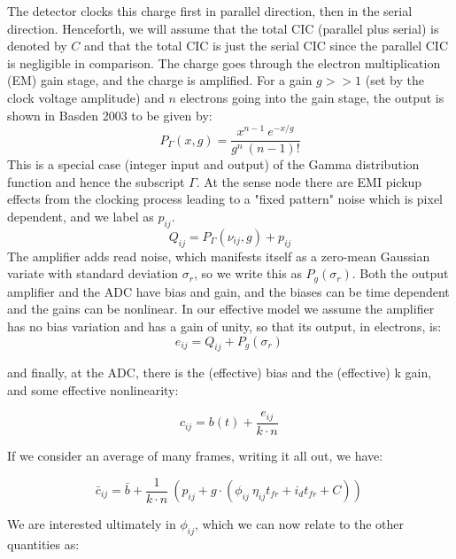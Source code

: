 \documentclass{article}
\begin{document}
The detector clocks this charge first in parallel direction, then in the serial direction.  Henceforth, we will assume that the total CIC (parallel plus serial) is denoted by $C$ and that the total CIC is just the serial CIC since the parallel CIC is negligible in comparison.  The charge goes through the electron multiplication (EM) gain stage, and the charge is amplified. For a gain $g >> 1$ (set by the clock voltage amplitude) and $n$ electrons going into the gain stage, the output is shown in Basden 2003 to be given by:
\begin{equation}
\label{eq:Basden}
P_\Gamma(x,g)=\frac{x^{n-1}\ e^{-x/g}}{g^n\ (n-1)!}
\end{equation}
This is a special case (integer input and output) of the Gamma distribution function and hence the subscript $\Gamma$.
At the sense node there are EMI pickup effects from the clocking process leading to a "fixed pattern" noise which is pixel dependent, and we label as $p_{ij}$.
\begin{equation}
Q_{ij} = P_\Gamma\left(\nu_{ij}, g \right)  + p_{ij}
\end{equation}
The amplifier adds read noise, which manifests itself as a zero-mean Gaussian variate with standard deviation $\sigma_r$, so we write this as $P_g(\sigma_r)$. Both the output amplifier and the ADC have bias and gain, and the biases can be time dependent and the gains can be nonlinear. In our effective model we assume the amplifier has no bias variation and has a gain of unity, so that its output, in electrons, is:
\begin{equation}
e_{ij} = Q_{ij} + P_g(\sigma_r) \,
\end{equation}

and finally, at the ADC, there is the (effective) bias and the (effective) k gain, and some effective nonlinearity:

\begin{equation}
\label{eq:cts_noav}
c_{ij} = b(t) + \frac{e_{ij}}{k\cdot n} \,
\end{equation}

If we consider an average of many frames, writing it all out, we have:

\begin{equation}
\bar{c}_{ij} = \bar{b} + \frac{1}{k\cdot n}\ \left(p_{ij} + g\cdot (\phi_{ij}\ \eta_{ij} t_{fr} + i_d t_{fr} + C )\right) \,
\end{equation}

We are interested ultimately in $\phi_{ij}$, which we can now relate to the other quantities as:
\end{document}
